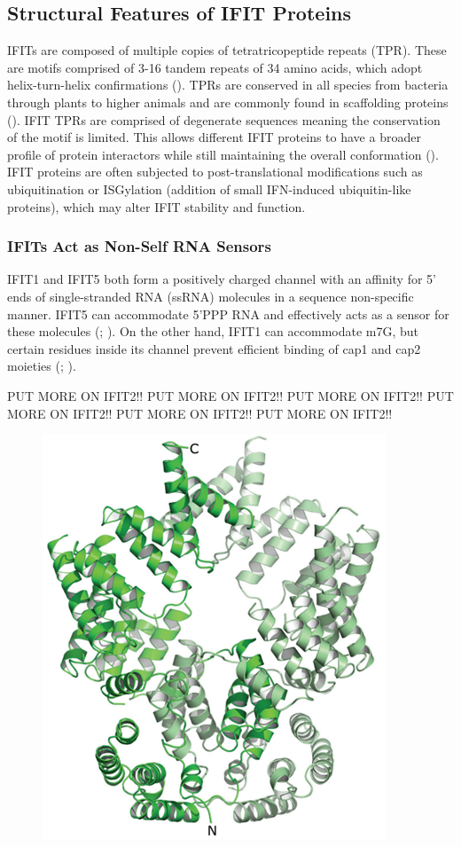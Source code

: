 \subsection{Structural Features of IFIT Proteins} \label{subsec:Structural Features of IFIT Proteins}
IFITs are composed of multiple copies of tetratricopeptide repeats (TPR). These are motifs comprised of 3-16 tandem repeats of 34 amino acids, which adopt helix-turn-helix confirmations (\cite{DAndrea2003TPRHelix}). TPRs are conserved in all species from bacteria through plants to higher animals and are commonly found in scaffolding proteins (\cite{Vladimer2014IFITs:Proteins}). IFIT TPRs are comprised of degenerate sequences meaning the conservation of the motif is limited. This allows different IFIT proteins to have a broader profile of protein interactors while still maintaining the overall conformation (\cite{Fensterl2015Interferon-InducedPathogenesis}). IFIT proteins are often subjected to post-translational modifications such as ubiquitination or ISGylation (addition of small IFN-induced ubiquitin-like proteins), which may alter IFIT stability and function.




\subsubsection{IFITs Act as Non-Self RNA Sensors} \label{IFITs Act as Non-Self RNA Sensors}
IFIT1 and IFIT5 both form a positively charged channel with an affinity for 5’ ends of single-stranded RNA (ssRNA) molecules in a sequence non-specific manner. IFIT5 can accommodate 5’PPP RNA and effectively acts as a sensor for these molecules (\cite{Abbas2013StructuralProteins}; \cite{Pichlmair2011IFIT1RNA}). On the other hand, IFIT1 can accommodate m7G, but certain residues inside its channel prevent efficient binding of cap1 and cap2 moieties (\cite{Diamond2014IFIT1:Translation}; \cite{Mears2018BetterResponse}). 

PUT MORE ON IFIT2!! PUT MORE ON IFIT2!! PUT MORE ON IFIT2!! PUT MORE ON IFIT2!! PUT MORE ON IFIT2!! PUT MORE ON IFIT2!! 

\begin{figure}
    \centering
    \includegraphics[width=0.25\linewidth]{04. Introduction//Figs/IFIT2-structure.png}
    
    
\end{figure}

